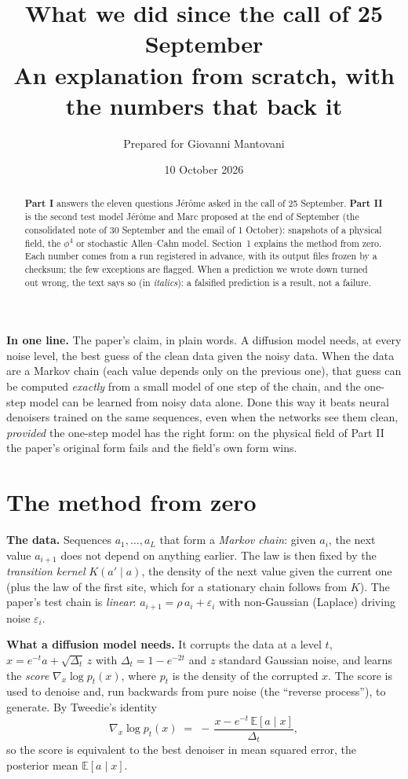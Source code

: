 \documentclass[11pt,a4paper]{article}
\title{\textbf{What we did since the call of 25 September}\\[0.3em]\large An explanation from scratch, with the numbers that back it}
\author{Prepared for Giovanni Mantovani}
\date{10 October 2026}
\newcommand{\key}[1]{\par\smallskip\noindent\colorbox{soft}{\parbox{\dimexpr\linewidth-2\fboxsep}{\small\textbf{In one line.} #1}}\par\smallskip}
\newcommand{\fals}[1]{{\small\itshape #1}}
\begin{document}
\maketitle
\vspace{-1.6em}

\begin{abstract}\noindent
\textbf{Part I} answers the eleven questions Jérôme asked in the call of 25 September. \textbf{Part II} is the second test model
Jérôme and Marc proposed at the end of September (the consolidated note of 30 September and the email of 1 October): snapshots of a
physical field, the $\phi^4$ or stochastic Allen--Cahn model. Section~1 explains the method from zero. Each number comes from a run
registered in advance, with its output files frozen by a checksum; the few exceptions are flagged. When a prediction we wrote
down turned out wrong, the text says so (in \fals{italics}): a falsified prediction is a result, not a failure.
\end{abstract}

\key{The paper's claim, in plain words. A diffusion model needs, at every noise level, the best guess of the clean data given the
noisy data. When the data are a Markov chain (each value depends only on the previous one), that guess can be computed
\emph{exactly} from a small model of one step of the chain, and the one-step model can be learned from noisy data alone. Done this
way it beats neural denoisers trained on the same sequences, even when the networks see them clean, \emph{provided} the one-step
model has the right form: on the physical field of Part II the paper's original form fails and the field's own form wins.}

\section{The method from zero}

\textbf{The data.} Sequences $a_1,\dots,a_L$ that form a \emph{Markov chain}: given $a_i$, the next value $a_{i+1}$ does not depend
on anything earlier. The law is then fixed by the \emph{transition kernel} $K(a'\mid a)$, the density of the next value given the
current one (plus the law of the first site, which for a stationary chain follows from $K$). The paper's test chain is
\emph{linear}: $a_{i+1}=\rho\,a_i+\varepsilon_i$ with non-Gaussian (Laplace) driving noise $\varepsilon_i$.

\textbf{What a diffusion model needs.} It corrupts the data at a level $t$, $x=e^{-t}a+\sqrt{\Delta_t}\,z$ with $\Delta_t=1-e^{-2t}$ and
$z$ standard Gaussian noise, and learns the \emph{score} $\nabla_x\log p_t(x)$, where $p_t$ is the density of the corrupted $x$. The
score is used to denoise and, run backwards from pure noise (the ``reverse process''), to generate. By Tweedie's identity
\[
\nabla_x\log p_t(x) \;=\; -\,\frac{x-e^{-t}\,\mathbb E[a\mid x]}{\Delta_t},
\]
so the score is equivalent to the best denoiser in mean squared error, the posterior mean $\mathbb E[a\mid x]$.
\end{document}
